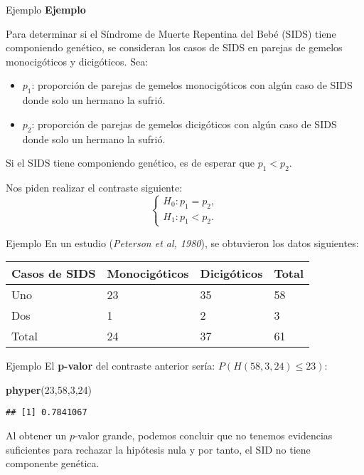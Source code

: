 \documentclass[
  ignorenonframetext,
]{beamer}
\newenvironment{Shaded}{\begin{snugshade}}{\end{snugshade}}
\newcommand{\DecValTok}[1]{\textcolor[rgb]{0.00,0.00,0.81}{#1}}
\newcommand{\KeywordTok}[1]{\textcolor[rgb]{0.13,0.29,0.53}{\textbf{#1}}}
\newcommand{\NormalTok}[1]{#1}
\begin{document}
\begin{frame}{Ejemplo}
\protect\hypertarget{ejemplo-7}{}
\textbf{Ejemplo}

Para determinar si el Síndrome de Muerte Repentina del Bebé (SIDS) tiene
componiendo genético, se consideran los casos de SIDS en parejas de
gemelos monocigóticos y dicigóticos. Sea:

\begin{itemize}
\item
  \(p_1\): proporción de parejas de gemelos monocigóticos con algún caso
  de SIDS donde solo un hermano la sufrió.
\item
  \(p_2\): proporción de parejas de gemelos dicigóticos con algún caso
  de SIDS donde solo un hermano la sufrió.
\end{itemize}

Si el SIDS tiene componiendo genético, es de esperar que \(p_1<p_2\).

Nos piden realizar el contraste siguiente: \[
\left\{\begin{array}{l}
H_0:p_1=p_2,\\
H_1:p_1< p_2.
\end{array}\right.
\]
\end{frame}

\begin{frame}{Ejemplo}
\protect\hypertarget{ejemplo-8}{}
En un estudio (\emph{Peterson et al, 1980}), se obtuvieron los datos
siguientes:

\begin{longtable}[]{@{}llll@{}}
\toprule
Casos de SIDS & Monocigóticos & Dicigóticos & Total\tabularnewline
\midrule
\endhead
Uno & 23 & 35 & 58\tabularnewline
Dos & 1 & 2 & 3\tabularnewline
Total & 24 & 37 & 61\tabularnewline
\bottomrule
\end{longtable}
\end{frame}

\begin{frame}[fragile]{Ejemplo}
\protect\hypertarget{ejemplo-9}{}
El \textbf{p-valor} del contraste anterior sería:
\(P(H(58,3,24)\leq 23)\):

\begin{Shaded}
\begin{Highlighting}[]
\KeywordTok{phyper}\NormalTok{(}\DecValTok{23}\NormalTok{,}\DecValTok{58}\NormalTok{,}\DecValTok{3}\NormalTok{,}\DecValTok{24}\NormalTok{)}
\end{Highlighting}
\end{Shaded}

\begin{verbatim}
## [1] 0.7841067
\end{verbatim}

Al obtener un \(p\)-valor grande, podemos concluir que no tenemos
evidencias suficientes para rechazar la hipótesis nula y por tanto, el
SID no tiene componente genética.
\end{frame}
\end{document}
